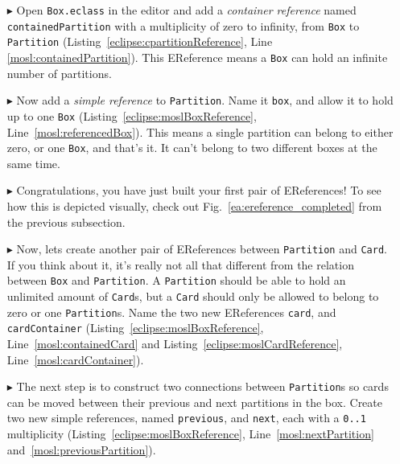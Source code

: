 \begin{itemize}

\item[$\blacktriangleright$] Open \texttt{Box.eclass} in the editor and add a \emph{container reference} named \texttt{containedPartition} with a
multiplicity of zero to infinity, from \texttt{Box} to \texttt{Partition} (Listing~\ref{eclipse:cpartitionReference}, Line \ref{mosl:containedPartition}). This EReference means a \texttt{Box}
can hold an infinite number of partitions.

\vspace{0.5cm}


\item[$\blacktriangleright$] Now add a \emph{simple reference} to \texttt{Partition}. Name it \texttt{box}, and allow it to hold up to one \texttt{Box}
(Listing~\ref{eclipse:moslBoxReference}, Line~\ref{mosl:referencedBox}). This means a single partition can belong to either zero, or one \texttt{Box}, and that's it. It can't belong to two different
boxes at the same time.

\vspace{0.5cm}

\item[$\blacktriangleright$] Congratulations, you have just built your first pair of EReferences! To see how this is depicted visually, check out
Fig.~\ref{ea:ereference_completed} from the previous subsection.

\vspace{0.5cm}

\item[$\blacktriangleright$] Now, lets create another pair of EReferences between \texttt{Partition} and \texttt{Card}. If you think about it, it's really not
all that different from the relation between \texttt{Box} and \texttt{Partition}. A \texttt{Partition} should be able to hold an unlimited amount of
\texttt{Card}s, but a \texttt{Card} should only be allowed to belong to zero or one \texttt{Partition}s. Name the two new EReferences
\texttt{card}, and \texttt{cardContainer} (Listing~\ref{eclipse:moslBoxReference}, Line~\ref{mosl:containedCard} and Listing~\ref{eclipse:moslCardReference}, Line~\ref{mosl:cardContainer}).

\vspace{0.5cm}

\item[$\blacktriangleright$] The next step is to construct two connections between \texttt{Partition}s so cards can be moved between their previous and next
partitions in the box. Create two new simple references, named \texttt{previous}, and \texttt{next}, each with a \texttt{0..1} multiplicity (Listing~\ref{eclipse:moslBoxReference}, Line~\ref{mosl:nextPartition} and~\ref{mosl:previousPartition}).


\end{itemize}
